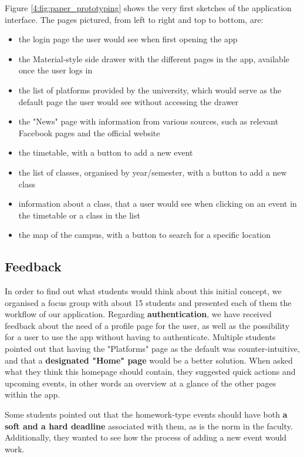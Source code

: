 Figure \ref{4:fig:paper_prototyping} shows the very first sketches of the application interface. The pages pictured, from left to right and top to bottom, are:
\begin{itemize}
    \setlength{\topsep}{0.5pt}
    \setlength{\itemsep}{0.5pt}
    \setlength{\parsep}{0.5pt}
    \item the login page the user would see when first opening the app
    \item the Material\cite{google2020material}-style side drawer with the different pages in the app, available once the user logs in
    \item the list of platforms provided by the university, which would serve as the default page the user would see without accessing the drawer
    \item the "News" page with information from various sources, such as relevant Facebook pages and the official website
    \item the timetable, with a button to add a new event
    \item the list of classes, organised by year/semester, with a button to add a new class
    \item information about a class, that a user would see when clicking on an event in the timetable or a class in the list
    \item the map of the campus, with a button to search for a specific location
\end{itemize}

\subsection{Feedback} \label{4:paper_feedback}

In order to find out what students would think about this initial concept, we organised a focus group with about 15 students and presented each of them the workflow of our application. Regarding \textbf{authentication}, we have received feedback about the need of a profile page for the user, as well as the possibility for a user to use the app without having to authenticate. Multiple students pointed out that having the "Platforms" page as the default was counter-intuitive, and that a \textbf{designated "Home" page} would be a better solution. When asked what they think this homepage should contain, they suggested quick actions and upcoming events, in other words an overview at a glance of the other pages within the app.

Some students pointed out that the homework-type events should have both \textbf{a soft and a hard deadline} associated with them, as is the norm in the faculty. Additionally, they wanted to see how the process of adding a new event would work.

